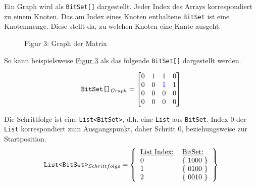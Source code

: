 \documentclass[a4paper,10pt,ngerman]{scrartcl}
\begin{document}
    Ein Graph wird als \texttt{BitSet[]} dargestellt.
    Jeder Index des Arrays korrespondiert zu einem Knoten.
    Das am Index eines Knoten enthaltene \texttt{BitSet} ist eine Knotenmenge.
    Diese stellt da, zu welchen Knoten eine Kante ausgeht.

    \begin{figure}[!h]
        \centering
        \caption{Figur 3: Graph der Matrix}

        \label{fig:Figure3}
    \end{figure}

    So kann beispielsweise \hyperref[fig:Figure3]{Figur 3} als das folgende \texttt{BitSet[]} dargestellt werden.

    \[
        \texttt{BitSet[]}_{Graph} = \begin{bmatrix}
                                        0 & \textcolor{blue}{1} & 1                   & 0 \\
                                        0 & 0                   & \textcolor{blue}{1} & 1 \\
                                        0 & 0                   & 0                   & 0 \\
                                        0 & 0                   & 0                   & 0 \\
        \end{bmatrix}
    \]

    Die Schrittfolge ist eine \texttt{List<BitSet>},
    d.h. eine \texttt{List} aus \texttt{BitSet}.
    Index 0 der \texttt{List} korrespondiert zum Ausgangspunkt,
    daher Schritt 0,  beziehungsweise zur Startposition.
    \[
        \texttt{List<BitSet>}_{Schrittfolge} = \left\lbrace
        \begin{tabular}{ll}
            \underline{\text{List Index:}} & \underline{\text{BitSet:}} \\
            0                              & \{ 1000 \}                 \\
            1                              & \{ 0100 \}                 \\
            2                              & \{ 0010 \}                 \\
        \end{tabular}
        \right\rbrace
    \]
\end{document}
